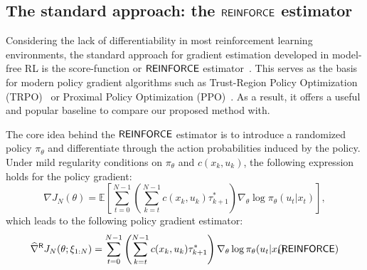 

 

\subsection{The standard approach: the $\mathsf{REINFORCE}$ estimator}


Considering the lack of differentiability in most reinforcement learning environments, the standard approach for gradient estimation developed in model-free RL is the score-function or $\mathsf{REINFORCE}$ estimator~\cite{williams1992simple,sutton1999policy}. This serves as the basis for modern policy gradient algorithms such as Trust-Region Policy Optimization (TRPO)~\cite{schulman2015trust} or Proximal Policy Optimization (PPO)~\cite{schulman2017proximal}. As a result, it offers a useful and popular baseline to compare our proposed method with.

 The core idea behind the $\mathsf{REINFORCE}$ estimator is to introduce a randomized policy $\pi_{\theta}$ and differentiate through the action probabilities induced by the policy. Under mild regularity conditions on $\pi_{\theta}$ and $c(x_k,u_k)$, the following expression holds for the policy gradient:
\[
\nabla J_{N}(\theta) = \mathbb{E}\left[\sum_{t=0}^{N-1} \left(\sum_{k=t}^{N-1}c(x_{k},u_{k})\tau^{*}_{k+1}  \right) \nabla_{\theta}\log \pi_{\theta}(u_{t}|x_{t})\right],
\]
which leads to the following policy gradient estimator:
\begin{equation}
\label{eq:reinforce}
\widehat{\nabla}^{\mathsf{R}} J_{N}(\theta; \xi_{1:N}) = \sum_{t=0}^{N-1} \left(\sum_{k=t}^{N-1}c(x_{k},u_{k})\tau^{*}_{k+1}  \right) \nabla_{\theta}\log \pi_{\theta}(u_{t}|x_{t}).
\hspace{-3em}
\tag{$\reinforce$}
\end{equation}

